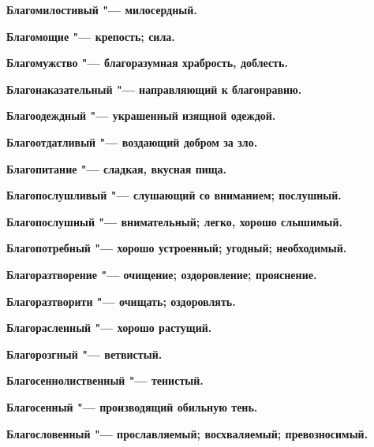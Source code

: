 \begin{mymulticols}{2}
\bfseries Благомилостивый\normalfont{} "--- милосердный. 




\bfseries Благомощие\normalfont{} "--- крепость; сила. 




\bfseries Благомужство\normalfont{} "--- благоразумная храбрость, доблесть. 




\bfseries Благонаказательный\normalfont{} "--- направляющий к благонравию. 




\bfseries Благоодеждный\normalfont{} "--- украшенный изящной одеждой. 




\bfseries Благоотдатливый\normalfont{} "--- воздающий добром за зло. 




\bfseries Благопитание\normalfont{} "--- сладкая, вкусная пища. 




\bfseries Благопослушливый\normalfont{} "--- слушающий со вниманием; послушный. 




\bfseries Благопослушный\normalfont{} "--- внимательный; легко, хорошо слышимый. 




\bfseries Благопотребный\normalfont{} "--- хорошо устроенный; угодный; необходимый. 




\bfseries Благоразтворение\normalfont{} "--- очищение; оздоровление; прояснение. 




\bfseries Благоразтворити\normalfont{} "--- очищать; оздоровлять. 




\bfseries Благорасленный\normalfont{} "--- хорошо растущий. 




\bfseries Благорозгный\normalfont{} "--- ветвистый. 




\bfseries Благосеннолиственный\normalfont{} "--- тенистый. 




\bfseries Благосенный\normalfont{} "--- производящий обильную тень. 




\bfseries Благословенный\normalfont{} "--- прославляемый; восхваляемый; превозносимый. 





\end{mymulticols}
